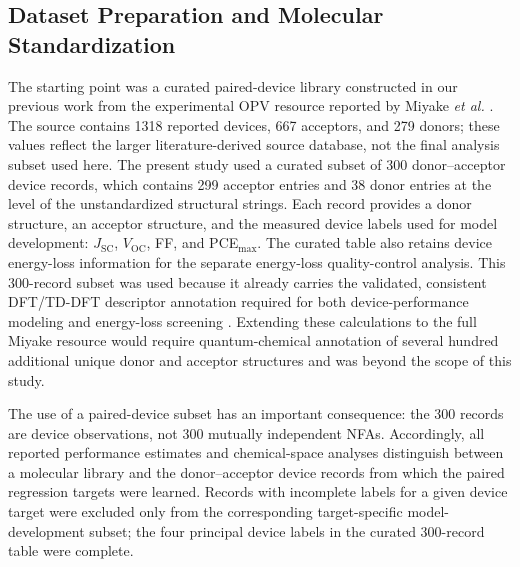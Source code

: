 \documentclass[12pt]{article}
\newcommand{\voc}{$V_\mathrm{OC}$}
\newcommand{\jsc}{$J_\mathrm{SC}$}
\newcommand{\pce}{PCE$_\mathrm{{max}}$}
\begin{document}
\subsection{Dataset Preparation and Molecular Standardization}
The starting point was a curated paired-device library constructed in our previous work from the experimental OPV resource reported by Miyake \textit{et al.} \cite{miyake2021machine}. The source contains 1318 reported devices, 667 acceptors, and 279 donors; these values reflect the larger literature-derived source database, not the final analysis subset used here. The present study used a curated subset of 300 donor--acceptor device records, which contains 299 acceptor entries and 38 donor entries at the level of the unstandardized structural strings. Each record provides a donor structure, an acceptor structure, and the measured device labels used for model development: \jsc, \voc, FF, and \pce. The curated table also retains device energy-loss information for the separate energy-loss quality-control analysis. This 300-record subset was used because it already carries the validated, consistent DFT/TD-DFT descriptor annotation required for both device-performance modeling and energy-loss screening \cite{das2024predictive}. Extending these calculations to the full Miyake resource would require quantum-chemical annotation of several hundred additional unique donor and acceptor structures and was beyond the scope of this study.

The use of a paired-device subset has an important consequence: the 300 records are device observations, not 300 mutually independent NFAs. Accordingly, all reported performance estimates and chemical-space analyses distinguish between a molecular library and the donor--acceptor device records from which the paired regression targets were learned. Records with incomplete labels for a given device target were excluded only from the corresponding target-specific model-development subset; the four principal device labels in the curated 300-record table were complete.
\end{document}
